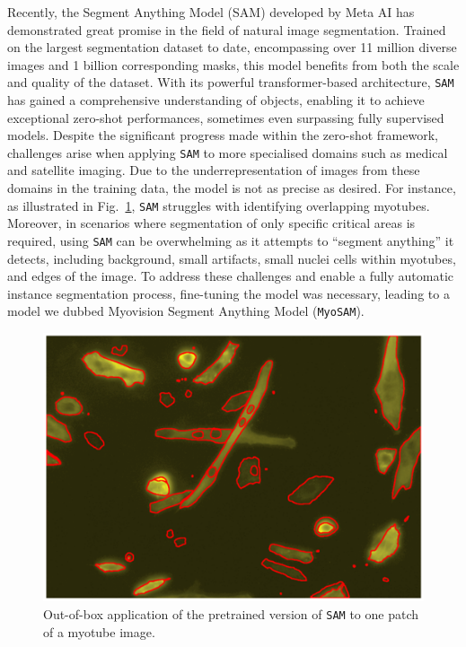 Recently, the Segment Anything Model (SAM) \cite{kirillov2023segment} developed by Meta AI has demonstrated great promise in the field of natural image segmentation. Trained on the largest segmentation dataset to date, encompassing over 11 million diverse images and 1 billion corresponding masks, this model benefits from both the scale and quality of the dataset. With its powerful transformer-based architecture, \texttt{SAM} has gained a comprehensive understanding of objects, enabling it to achieve exceptional zero-shot performances, sometimes even surpassing fully supervised models.
Despite the significant progress made within the zero-shot framework, challenges arise when applying \texttt{SAM} to more specialised domains such as medical and satellite imaging. Due to the underrepresentation of images from these domains in the training data, the model is not as precise as desired. For instance, as illustrated in Fig.~\ref{figzeroshot}, \texttt{SAM} struggles with identifying overlapping myotubes. Moreover, in scenarios where segmentation of only specific critical areas is required, using \texttt{SAM} can be overwhelming as it attempts to “segment anything” it detects, including background, small artifacts, small nuclei cells within myotubes, and edges of the image. To address these challenges and enable a fully automatic instance segmentation process, fine-tuning the model was necessary, leading to a model we dubbed Myovision Segment Anything Model (\texttt{MyoSAM}).

\begin{figure}
	\centering
	\includegraphics[width=\textwidth]{"images/sam_zeroshot.png"}
	\caption[\texttt{SAM} zeroshot]{Out-of-box application of the pretrained version of \texttt{SAM} to one patch of a myotube image.}
	\label{figzeroshot}
\end{figure}
